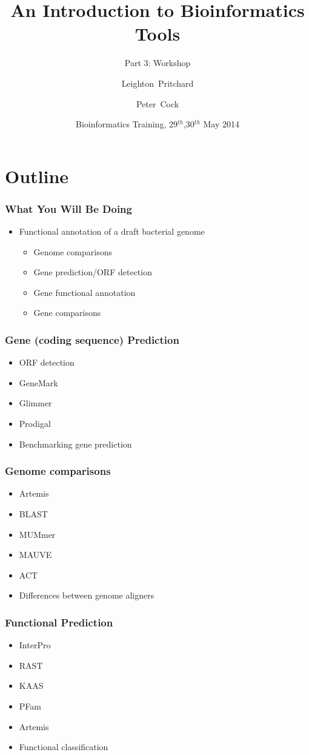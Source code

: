 \documentclass[table]{beamer}
\title[Intro to Bioinformatics] %
{An Introduction to Bioinformatics Tools}
\subtitle{Part 3: Workshop}
\author[Pritchard, Cock] %
{Leighton~Pritchard \and Peter~Cock}
\institute[The James Hutton Institute] %
{
  Information and Computational Sciences\\
  The James Hutton Institute
}
\date[May 2014] %
{Bioinformatics Training, 29$^{th}$,30$^{th}$ May 2014}
\begin{document}
  \frame[plain]{\titlepage}
  
\section{Outline}

    \begin{frame}
     \frametitle{What You Will Be Doing}
     \begin{itemize}
       \item Functional annotation of a draft bacterial genome
       \begin{itemize}
         \item Genome comparisons
         \item Gene prediction/ORF detection
         \item Gene functional annotation
         \item Gene comparisons
       \end{itemize}
     \end{itemize}
    \end{frame}

    \begin{frame}
     \frametitle{Gene (coding sequence) Prediction}
     \begin{itemize}
       \item ORF detection
       \item GeneMark
       \item Glimmer
       \item Prodigal
       \item Benchmarking gene prediction
     \end{itemize}
    \end{frame}
    
    \begin{frame}
     \frametitle{Genome comparisons}
     \begin{itemize}
       \item Artemis
       \item BLAST
       \item MUMmer
       \item MAUVE
       \item ACT
       \item Differences between genome aligners
     \end{itemize}
    \end{frame}

    \begin{frame}
     \frametitle{Functional Prediction}
     \begin{itemize}
       \item InterPro
       \item RAST
       \item KAAS
       \item PFam
       \item Artemis
       \item Functional classification
     \end{itemize}
    \end{frame}
    
\end{document}
